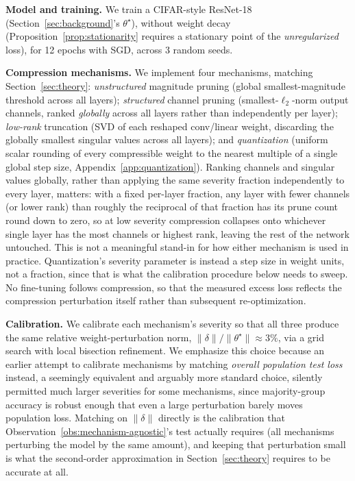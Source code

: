 \documentclass{article}
\newcommand{\theorig}{\theta^\star}
\begin{document}
\textbf{Model and training.} We train a CIFAR-style ResNet-18 \citep{he2016resnet} (Section~\ref{sec:background}'s $\theorig$), without weight decay (Proposition~\ref{prop:stationarity} requires a stationary point of the \emph{unregularized} loss), for 12 epochs with SGD, across 3 random seeds.

\textbf{Compression mechanisms.} We implement four mechanisms, matching Section~\ref{sec:theory}: \emph{unstructured} magnitude pruning (global smallest-magnitude threshold across all layers); \emph{structured} channel pruning (smallest-$\ell_2$-norm output channels, ranked \emph{globally} across all layers rather than independently per layer); \emph{low-rank} truncation (SVD of each reshaped conv/linear weight, discarding the globally smallest singular values across all layers); and \emph{quantization} (uniform scalar rounding of every compressible weight to the nearest multiple of a single global step size, Appendix~\ref{app:quantization}). Ranking channels and singular values globally, rather than applying the same severity fraction independently to every layer, matters: with a fixed per-layer fraction, any layer with fewer channels (or lower rank) than roughly the reciprocal of that fraction has its prune count round down to zero, so at low severity compression collapses onto whichever single layer has the most channels or highest rank, leaving the rest of the network untouched. This is not a meaningful stand-in for how either mechanism is used in practice. Quantization's severity parameter is instead a step size in weight units, not a fraction, since that is what the calibration procedure below needs to sweep. No fine-tuning follows compression, so that the measured excess loss reflects the compression perturbation itself rather than subsequent re-optimization.

\textbf{Calibration.} We calibrate each mechanism's severity so that all three produce the same relative weight-perturbation norm, $\|\delta\|/\|\theorig\| \approx 3\%$, via a grid search with local bisection refinement. We emphasize this choice because an earlier attempt to calibrate mechanisms by matching \emph{overall population test loss} instead, a seemingly equivalent and arguably more standard choice, silently permitted much larger severities for some mechanisms, since majority-group accuracy is robust enough that even a large perturbation barely moves population loss. Matching on $\|\delta\|$ directly is the calibration that Observation~\ref{obs:mechanism-agnostic}'s test actually requires (all mechanisms perturbing the model by the same amount), and keeping that perturbation small is what the second-order approximation in Section~\ref{sec:theory} requires to be accurate at all.
\end{document}
